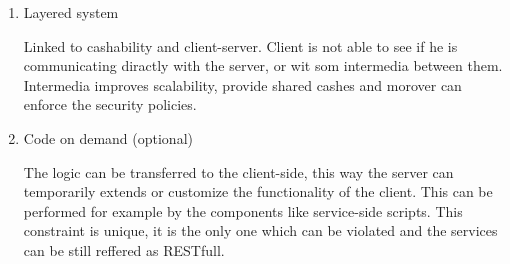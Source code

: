 \begin{description}
\begin{enumerate}
\item Layered system

Linked to cashability and client-server. Client is not able to see if he is communicating diractly with the server, or wit som intermedia between them. Intermedia improves scalability, provide shared cashes and morover can enforce the security policies.

\item Code on demand (optional)

The logic can be transferred to the client-side, this way the server can temporarily extends or customize the functionality of the client. This can be performed for example by the components like service-side scripts.
This constraint is unique, it is the only one which can be violated and the services can be still reffered as RESTfull.

\end{enumerate}
\end{description}


